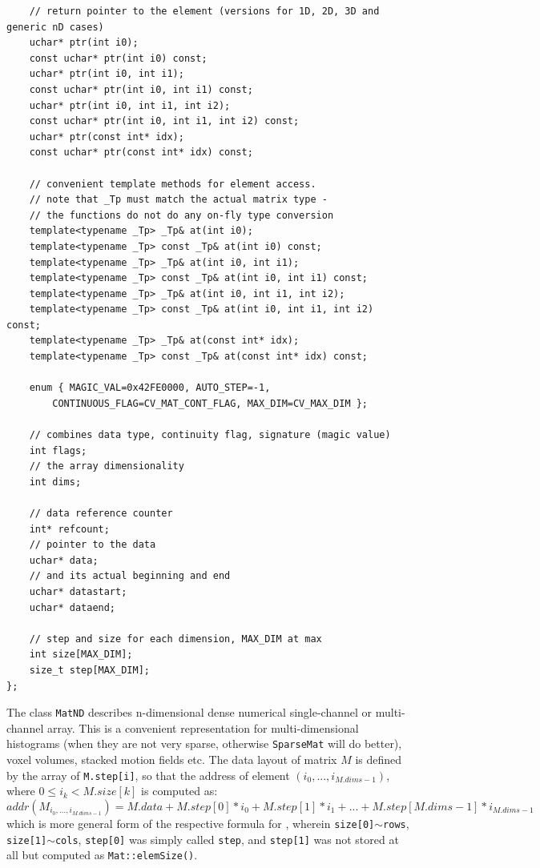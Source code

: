 \begin{lstlisting}
    // return pointer to the element (versions for 1D, 2D, 3D and generic nD cases)
    uchar* ptr(int i0);
    const uchar* ptr(int i0) const;
    uchar* ptr(int i0, int i1);
    const uchar* ptr(int i0, int i1) const;
    uchar* ptr(int i0, int i1, int i2);
    const uchar* ptr(int i0, int i1, int i2) const;
    uchar* ptr(const int* idx);
    const uchar* ptr(const int* idx) const;

    // convenient template methods for element access.
    // note that _Tp must match the actual matrix type -
    // the functions do not do any on-fly type conversion
    template<typename _Tp> _Tp& at(int i0);
    template<typename _Tp> const _Tp& at(int i0) const;
    template<typename _Tp> _Tp& at(int i0, int i1);
    template<typename _Tp> const _Tp& at(int i0, int i1) const;
    template<typename _Tp> _Tp& at(int i0, int i1, int i2);
    template<typename _Tp> const _Tp& at(int i0, int i1, int i2) const;
    template<typename _Tp> _Tp& at(const int* idx);
    template<typename _Tp> const _Tp& at(const int* idx) const;

    enum { MAGIC_VAL=0x42FE0000, AUTO_STEP=-1,
        CONTINUOUS_FLAG=CV_MAT_CONT_FLAG, MAX_DIM=CV_MAX_DIM };

    // combines data type, continuity flag, signature (magic value) 
    int flags;
    // the array dimensionality
    int dims;

    // data reference counter
    int* refcount;
    // pointer to the data
    uchar* data;
    // and its actual beginning and end
    uchar* datastart;
    uchar* dataend;

    // step and size for each dimension, MAX_DIM at max
    int size[MAX_DIM];
    size_t step[MAX_DIM];
};
\end{lstlisting}

The class \texttt{MatND} describes n-dimensional dense numerical single-channel or multi-channel array. This is a convenient representation for multi-dimensional histograms (when they are not very sparse, otherwise \texttt{SparseMat} will do better), voxel volumes, stacked motion fields etc. The data layout of matrix $M$ is defined by the array of \texttt{M.step[i]}, so that the address of element $(i_0,...,i_{M.dims-1})$, where $0\leq i_k<M.size[k]$ is computed as:
\[
addr(M_{i_0,...,i_{M.dims-1}}) = M.data + M.step[0]*i_0 + M.step[1]*i_1 + ... + M.step[M.dims-1]*i_{M.dims-1}
\]
which is more general form of the respective formula for , wherein \texttt{size[0]}$\sim$\texttt{rows},
\texttt{size[1]}$\sim$\texttt{cols}, \texttt{step[0]} was simply called \texttt{step}, and \texttt{step[1]} was not stored at all but computed as \texttt{Mat::elemSize()}.

